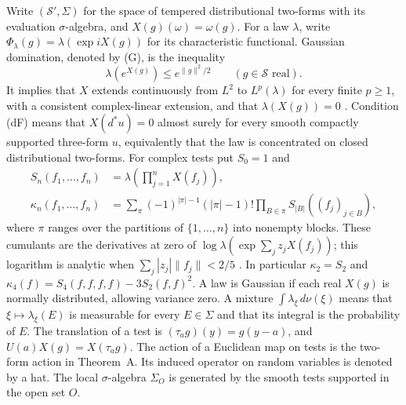 \documentclass[11pt,letterpaper,reqno]{amsart}
\theoremstyle{definition}
\begin{document}
Write $(\mathcal S',\Sigma)$ for the space of tempered distributional
two-forms with its evaluation $\sigma$-algebra, and $X(g)(\omega)=\omega(g)$.
For a law $\lambda$, write
$\Phi_\lambda(g)=\lambda(\exp iX(g))$ for its characteristic functional.
Gaussian domination, denoted by (G), is the inequality
\[
 \lambda(e^{X(g)})\le e^{\|g\|^2/2}
 \qquad(g\in\mathcal S\text{ real}).
\]
It implies that $X$ extends continuously from $L^2$ to $L^p(\lambda)$
for every finite $p\ge1$, with a consistent complex-linear extension,
and that $\lambda(X(g))=0$
\cite[Proposition~5.1]{QEDConstruction}.
Condition (dF) means that $X(d^*u)=0$ almost surely for every smooth
compactly supported three-form $u$, equivalently that the law is
concentrated on closed distributional two-forms.
For complex tests put $S_0=1$ and
\begin{equation}\label{qcm:moment-cumulant}
 \begin{split}
 S_n(f_1,\ldots,f_n)&=\lambda\!\left(\prod_{j=1}^nX(f_j)\right),\\
 \kappa_n(f_1,\ldots,f_n)
 &=\sum_{\pi}(-1)^{|\pi|-1}(|\pi|-1)!
       \prod_{B\in\pi}S_{|B|}((f_j)_{j\in B}),
 \end{split}
\end{equation}
where $\pi$ ranges over the partitions of $\{1,\ldots,n\}$ into nonempty
blocks. These cumulants are the derivatives at zero of
$\log\lambda(\exp\sum_jz_jX(f_j))$; this logarithm is analytic when
$\sum_j|z_j|\|f_j\|<2/5$
\cite[Section~5.2]{QEDConstruction}.
In particular $\kappa_2=S_2$ and
$\kappa_4(f)=S_4(f,f,f,f)-3S_2(f,f)^2$.
A law is Gaussian if each real $X(g)$ is normally distributed,
allowing variance zero. A mixture $\int\lambda_\xi\,d\nu(\xi)$ means
that $\xi\mapsto\lambda_\xi(E)$ is measurable for every $E\in\Sigma$
and that its integral is the probability of $E$.
The translation of a test is $(\tau_ag)(y)=g(y-a)$, and
$U(a)X(g)=X(\tau_ag)$. The action of a Euclidean map on tests is the
two-form action in Theorem~A. Its induced operator on random variables
is denoted by a hat. The local $\sigma$-algebra $\Sigma_O$ is generated by
the smooth tests supported in the open set $O$.
\end{document}
